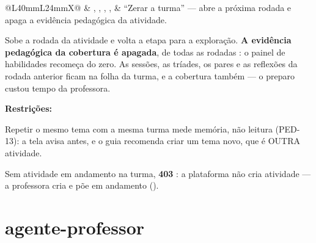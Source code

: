 \begin{tabularx}{\linewidth}{@{}L{40mm}L{24mm}X@{}}
\zebra {} & , , , ,  & \enquote{Zerar a turma} --- abre a próxima rodada e apaga a evidência pedagógica da atividade.\par Sobe a rodada da atividade e volta a etapa para a exploração. \textbf{A evidência pedagógica da cobertura é apagada}, de todas as rodadas : o painel de habilidades recomeça do zero. As sessões, as tríades, os pares e as reflexões da rodada anterior ficam na folha da turma, e a cobertura também --- o preparo custou tempo da professora.\par \textbf{Restrições:}\par \hspace*{1em}\textbullet{} Repetir o mesmo tema com a mesma turma mede memória, não leitura (PED-13): a tela avisa antes, e o guia recomenda criar um tema novo, que é OUTRA atividade.\par \hspace*{1em}\textbullet{} Sem atividade em andamento na turma, \textbf{403} : a plataforma não cria atividade --- a professora cria e põe em andamento ().\\
\bottomrule
\end{tabularx}

\section{agente-professor}

